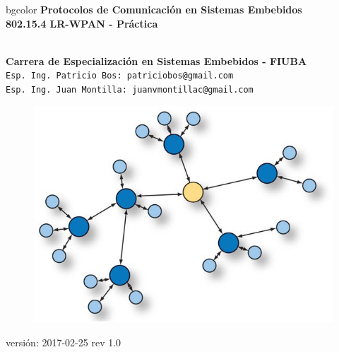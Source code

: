 \documentclass[aspectratio=169,handout]{beamer}
\begin{document}
\begingroup
\makeatletter
\setlength{\hoffset}{-.5\beamer@sidebarwidth}
\makeatother
\begin{frame}
\begin{center}
\hfill
    \begin{beamercolorbox}[center,dp=3ex,ht=10.25ex, wd=1\linewidth]{bgcolor}
        \Large\textbf{Protocolos de Comunicación en Sistemas Embebidos}\\
        \huge\textbf{802.15.4 LR-WPAN - Práctica}
    \end{beamercolorbox}
\hfill\hfill
\\
\vspace{5px}
\textbf{Carrera de Especialización en Sistemas Embebidos - FIUBA}\\
\vspace{10px}
\texttt{Esp. Ing. Patricio Bos: patriciobos@gmail.com}\\
\texttt{Esp. Ing. Juan Montilla: juanvmontillac@gmail.com}\\

\vspace{10px}

\begin{figure}[H]
	\includegraphics[width=.3\textwidth]{./imagenes/red.jpg}
\end{figure}	

\vspace{5px}
\tiny versión: 2017-02-25 rev 1.0 
 	  	
\end{center}
\end{frame}
\endgroup
\end{document}
